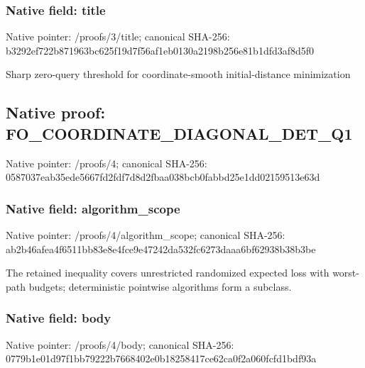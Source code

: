 \documentclass[10pt,a4paper]{article}
\begin{document}
\subsubsection{Native field: title}
Native pointer: /proofs/3/title; canonical SHA-256: b3292ef722b871963bc625f19d7f56af1eb0130a2198b256e81b1dfd3af8d5f0

\begingroup\raggedright\sloppy Sharp zero-query threshold for coordinate-smooth initial-distance minimization\par\endgroup

\subsection{Native proof: FO\_\allowbreak{}COORDINATE\_\allowbreak{}DIAGONAL\_\allowbreak{}DET\_\allowbreak{}Q1}
Native pointer: /proofs/4; canonical SHA-256: 0587037eab35ede5667fd2fdf7d8d2fbaa038bcb0fabbd25e1dd02159513e63d

\subsubsection{Native field: algorithm\_\allowbreak{}scope}
Native pointer: /proofs/4/algorithm\_\allowbreak{}scope; canonical SHA-256: ab2b46afea4f6511bb83e8e4fce9e47242da532fc6273daaa6bf62938b38b3be

\begingroup\raggedright\sloppy The retained inequality covers unrestricted randomized expected loss with worst-path budgets;\allowbreak{} deterministic pointwise algorithms form a subclass.\par\endgroup

\subsubsection{Native field: body}
Native pointer: /proofs/4/body; canonical SHA-256: 0779b1e01d97f1bb79222b7668402e0b18258417ce62ca0f2a060fcfd1bdf93a
\end{document}
